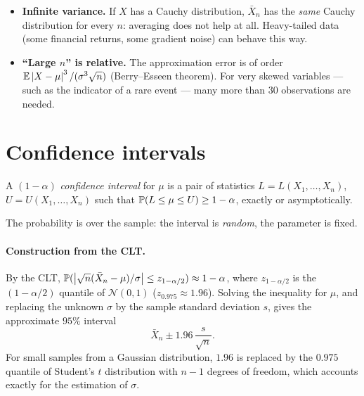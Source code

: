 \begin{notechapter}
\begin{pitfall}
\begin{itemize}[nosep]
  \item \textbf{Infinite variance.} If $X$ has a Cauchy distribution, $\bar X_n$
        has the \emph{same} Cauchy distribution for every $n$: averaging does
        not help at all. Heavy-tailed data (some financial returns, some
        gradient noise) can behave this way.
  \item \textbf{``Large $n$'' is relative.} The approximation error is of order
        $\mathbb{E}\left|X-\mu\right|^3/(\sigma^3\sqrt n)$ (Berry--Esseen theorem). For very
        skewed variables --- such as the indicator of a rare event --- many more
        than $30$ observations are needed.
\end{itemize}
\end{pitfall}

\section{Confidence intervals}\label{lln-clt-inference:sec:ci}

\begin{definition}
A $(1-\alpha)$ \emph{confidence interval} for $\mu$ is a pair of statistics
$L = L(X_1,\dots,X_n)$, $U = U(X_1,\dots,X_n)$ such that
$\mathbb{P}(L\leq\mu\leq U)\geq1-\alpha$, exactly or asymptotically.
\end{definition}

The probability is over the sample: the interval is \emph{random}, the
parameter is fixed.

\paragraph{Construction from the CLT.} By the CLT,
$\mathbb{P}(\left|\sqrt n(\bar X_n - \mu)/\sigma\right|\leq z_{1-\alpha/2})\approx1-\alpha$,
where $z_{1-\alpha/2}$ is the $(1-\alpha/2)$ quantile of $\mathcal N(0,1)$
($z_{0.975}\approx1.96$). Solving the inequality for $\mu$, and replacing the
unknown $\sigma$ by the sample standard deviation $s$, gives the approximate
$95\%$ interval
\[
  \bar X_n\pm1.96\,\frac{s}{\sqrt n} .
\]
For small samples from a Gaussian distribution, $1.96$ is replaced by the
$0.975$ quantile of Student's $t$ distribution with $n-1$ degrees of freedom,
which accounts exactly for the estimation of $\sigma$.


\end{notechapter}
